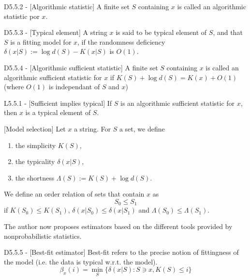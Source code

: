 \documentclass{article}
\begin{document}
\begin{flexidefinition}{D5.5.2 - }[Algorithmic statistic]
    A finite set $S$ containing $x$ is called an algorithmic statistic por $x$. 
\end{flexidefinition}

\begin{flexidefinition}{D5.5.3 - }[Typical element]
    A string $x$ is said to be typical element of $S$, and that $S$ is a fitting model for $x$, if the randomness deficiency $\delta(x|S) := \log d(S) - K(x|S)$ is $O(1)$.
\end{flexidefinition}

\begin{flexidefinition}{D5.5.4 - }[Algorithmic sufficient statistic]
    A finite set $S$ containing $x$ is called an algorithmic sufficient statistic for $x$ if $K(S) + \log d(S) = K(x) + O(1)$ (where $O(1)$ is independant of $S$ and $x$)
\end{flexidefinition}

\begin{flexilemma}{L5.5.1 - }[Sufficient implies typical]
    If $S$ is an algorithmic sufficient statistic for $x$, then $x$ is a typical element of $S$.
\end{flexilemma}

\begin{flexidefinition}{}[Model selection]
    Let $x$ a string. For $S$ a set, we define
    \begin{enumerate}[label=(\alph*)]
        \item the simplicity $K(S)$,
        \item the typicality $\delta(x|S)$,
        \item the shortness $\Lambda(S) := K(S) + \log d(S)$.
    \end{enumerate}
    We define an order relation of sets that contain $x$ as
    \begin{equation}
        S_0 \leq S_1
    \end{equation}
    if $K(S_0) \leq K(S_1)$, $\delta(x|S_0)\leq \delta(x|S_1)$ and $\Lambda(S_0) \leq \Lambda(S_1)$.
\end{flexidefinition}

The author now proposes estimators based on the different tools provided by nonprobabilistic statistics. 

\begin{flexidefinition}{D5.5.5 - }[Best-fit estimator]
    Best-fit refers to the precise notion of fittingness of the model (i.e. the data is typical w.r.t. the model). 
    \begin{equation}
        \beta_x(i) = \min_S \{\delta(x|S): S \ni x, K(S) \leq i\}
    \end{equation}
\end{flexidefinition}
\end{document}
